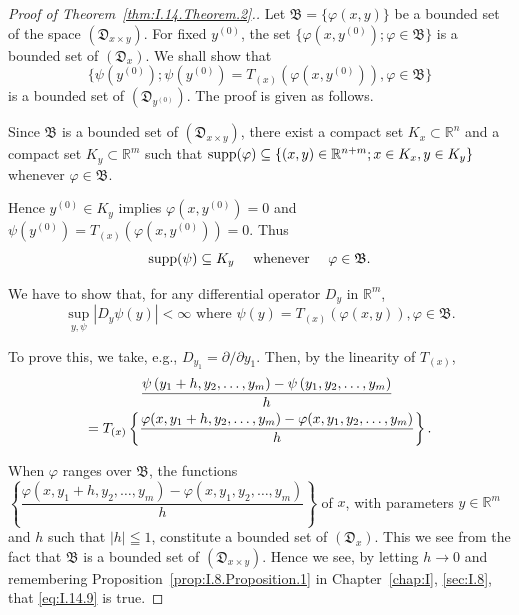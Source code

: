 \begin{proof}[Proof of Theorem~\ref{thm:I.14.Theorem.2}.]
Let $\mathfrak{B} = \{\varphi(x, y)\}$ be a bounded set of the space $(\mathfrak{D}_{x \times y})$. For fixed $y^{(0)}$, the set $\{\varphi(x, y^{(0)}); \varphi \in \mathfrak{B}\}$ is a bounded set of $(\mathfrak{D}_x)$. We shall show that
\begin{equation}\label{eq:I.14.7}
\{\psi (y ^{(0)}); \psi (y ^{(0)}) = T_{(x)} (\varphi (x, y ^{(0)})), \varphi \in \mathfrak {B} \}
\end{equation}
is a bounded set of $(\mathfrak{D}_{y^{(0)}})$. The proof is given as follows. 

Since $\mathfrak{B}$ is a bounded set of $(\mathfrak{D}_{x\times y})$, there exist a compact set $K_{x}\subset \mathbb{R}^{n}$ and a compact set $K_{y}\subset \mathbb{R}^{m}$ such that 
$\operatorname{supp}(\varphi) \subseteq \{(x, y) \in \mathbb{R}^{n+m}; x \in K_x, y \in K_y\}$ whenever $\varphi \in \mathfrak{B}$. 

Hence $y^{(0)} \in K_y$ implies $\varphi(x, y^{(0)}) = 0$ and $\psi(y^{(0)}) = T_{(x)}(\varphi(x, y^{(0)})) = 0$. Thus 
\begin{equation}\label{eq:I.14.8}
\operatorname{supp} (\psi) \subseteq K_{y} \quad \text{ whenever } \quad \varphi \in \mathfrak {B}.
\end{equation}

We have to show that, for any differential operator $D_{y}$ in $\mathbb{R}^{m}$, 
\begin{equation}\label{eq:I.14.9}
\sup\limits_{y, \psi} | D_{y} \psi (y) | < \infty \text{ where } \psi (y) = T_{(x)} (\varphi (x, y)), \varphi \in \mathfrak {B}.
\end{equation}

To prove this, we take, e.g., $D_{y_1} = \partial/\partial y_1$. Then, by the linearity of $T_{(x)}$, 
\begin{gather}\quad \frac {\psi \left(y_{1} + h , y_{2} , \dots , y_{m}\right)- \psi \left(y_{1} , y_{2} , \dots , y_{m}\right)}{h} \notag \\= T_{(x)} \left\{\frac {\varphi (x , y_{1} + h , y_{2} , \dots , y_{m})- \varphi (x , y_{1} , y_{2} , \dots , y_{m})}{h} \right\}. \notag
\end{gather}

When $\varphi$ ranges over $\mathfrak{B}$, the functions $\left\{\dfrac{\varphi (x, y_{1} + h, y_{2}, \dots , y_{m}) - \varphi (x, y_{1}, y_{2}, \dots , y_{m})}{h}\right\}$ of $x$, with parameters $y \in \mathbb{R}^{m}$ and $h$ such that $|h| \leqq 1$, constitute a bounded set of $(\mathfrak{D}_x)$. This we see from the fact that $\mathfrak{B}$ is a bounded set of $(\mathfrak{D}_{x \times y})$. Hence we see, by letting $h \to 0$ and remembering Proposition~\ref{prop:I.8.Proposition.1} in Chapter~\ref{chap:I}, \ref{sec:I.8}, that \eqref{eq:I.14.9} is true. 


\end{proof}
